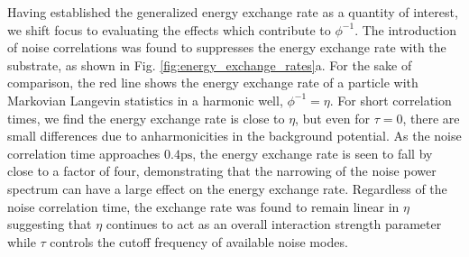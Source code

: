 \documentclass[7pt]{article}
\newcommand{\ps}{\si{\pico\second}}
\begin{document}
Having established the generalized energy exchange rate as a quantity of interest, we shift focus to evaluating the effects which contribute to $\phi^{-1}$. The introduction of noise correlations was found to suppresses the energy exchange rate with the substrate, as shown in Fig. \ref{fig:energy_exchange_rates}a. For the sake of comparison, the red line shows the energy exchange rate of a particle with Markovian Langevin statistics in a harmonic well, $\phi^{-1}=\eta$. For short correlation times, we find the energy exchange rate is close to $\eta$, but even for $\tau=0$, there are small differences due to anharmonicities in the background potential. As the noise correlation time approaches $0.4\ps$, the energy exchange rate is seen to fall by close to a factor of four, demonstrating that the narrowing of the noise power spectrum can have a large effect on the energy exchange rate. Regardless of the noise correlation time, the exchange rate was found to remain linear in $\eta$ suggesting that $\eta$ continues to act as an overall interaction strength parameter while $\tau$ controls the cutoff frequency of available noise modes. 
\end{document}
